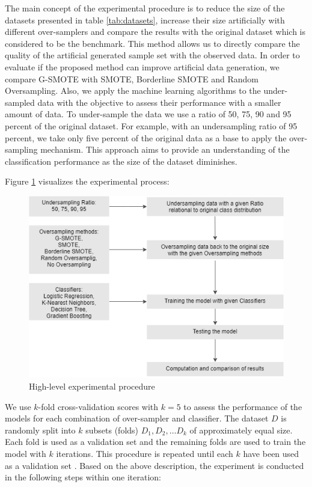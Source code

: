 \documentclass[parskip=full]{scrartcl}
\begin{document}
The main concept of the experimental procedure is to reduce the size of the
datasets presented in table \ref{tab:datasets}, increase their size artificially
with different over-samplers and compare the results with the original dataset
which is considered to be the benchmark. This method allows us to directly
compare the quality of the artificial generated sample set with the observed
data. In order to evaluate if the proposed method can improve artificial data
generation, we compare G-SMOTE with SMOTE, Borderline SMOTE and Random
Oversampling. Also, we apply the machine learning algorithms to the
under-sampled data with the objective to assess their performance with a smaller
amount of data. To under-sample the data we use a ratio of 50, 75, 90 and 95
percent of the original dataset. For example, with an undersampling ratio of 95
percent, we take only five percent of the original data as a base to apply the
over-sampling mechanism. This approach aims to provide an understanding of the
classification performance as the size of the dataset diminishes.

Figure \ref{fig:experimentalprocedure} visualizes the experimental process: 

\begin{figure}[H]
	\centering
	\includegraphics[width=0.7\linewidth]{../analysis/experimental_procedure.png}
	\caption{High-level experimental procedure}
	\label{fig:experimentalprocedure}
\end{figure}

We use \( k \)-fold cross-validation scores with \( k = 5 \) to assess the
performance of the models for each combination of over-sampler and classifier.
The dataset \( D \) is randomly split into \( k \) subsets (folds) \( D_1, D_2,
… D_k \) of approximately equal size. Each fold is used as a validation set and
the remaining folds are used to train the model with \( k \) iterations. This
procedure is repeated until each \( k \) have been used as a validation set
\cite{Han.2012}. Based on the above description, the experiment is conducted in
the following steps within one iteration:
\end{document}
